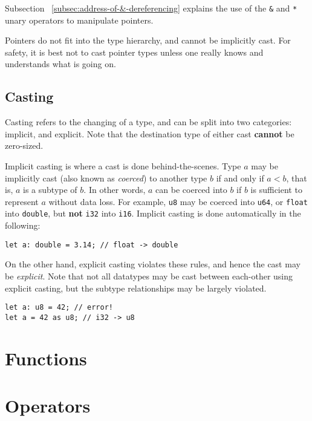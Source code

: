 \documentclass{article}
\begin{document}
    Subsection ~\ref{subsec:address-of-&-dereferencing} explains the use of the \texttt{\&} and \texttt{*} unary operators to manipulate pointers.

    Pointers do not fit into the type hierarchy, and cannot be implicitly cast.
    For safety, it is best not to cast pointer types unless one really knows and understands what is going on.

    \subsection{Casting}\label{subsec:type-casting}

    Casting refers to the changing of a type, and can be split into two categories: implicit, and explicit.
    Note that the destination type of either cast \textbf{cannot} be zero-sized.

    Implicit casting is where a cast is done behind-the-scenes.
    Type \(a\) may be implicitly cast (also known as \textit{coerced}) to another type \(b\) if and only if \(a < b\), that is, \(a\) is a subtype of \(b\).
    In other words, \(a\) can be coerced into \(b\) if \(b\) is sufficient to represent \(a\) without data loss.
    For example, \texttt{u8} may be coerced into \texttt{u64}, or \texttt{float} into \texttt{double}, but \textbf{not} \texttt{i32} into \texttt{i16}.
    Implicit casting is done automatically in the following:

    \begin{lstlisting}[language=CustomLang]
let a: double = 3.14; // float -> double
    \end{lstlisting}

    On the other hand, explicit casting violates these rules, and hence the cast may be \textit{explicit}.
    Note that not all datatypes may be cast between each-other using explicit casting, but the subtype relationships may be largely violated.

    \begin{lstlisting}[language=CustomLang]
let a: u8 = 42; // error!
let a = 42 as u8; // i32 -> u8
    \end{lstlisting}

    \section{Functions}

    \section{Operators}
\end{document}
